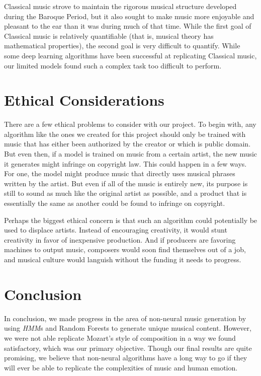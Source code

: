 \documentclass[11pt]{article}
\begin{document}
Classical music strove to maintain the rigorous musical structure 
developed during the Baroque Period, but it also sought to make music more 
enjoyable and pleasant to the ear than it was during much of that time. 
While the first goal of Classical music is relatively quantifiable (that is,
musical theory has mathematical properties), the second goal is very difficult to
quantify. While some deep learning algorithms have been successful at replicating Classical music, our limited models found such a complex task too difficult to perform.

\section{Ethical Considerations}
There are a few ethical problems to consider with our project. To begin with, any algorithm like the ones we created for this project should only be trained with music that has either been authorized by the creator or which is public domain. But even then, if a model is trained on music from a certain artist, the new music it generates might infringe on copyright law. This could happen in a few ways. For one, the model might produce music that directly uses musical phrases written by the artist. But even if all of the music is entirely new, its purpose is still to sound as much like the original artist as possible, and a product that is essentially the same as another could be found to infringe on copyright.

Perhaps the biggest ethical concern is that such an algorithm could potentially be used to displace artists. Instead of encouraging creativity, it would stunt creativity in favor of inexpensive production. And if producers are favoring machines to output music, composers would soon find themselves out of a job, and musical culture would languish without the funding it needs to progress.

\section{Conclusion}
In conclusion, we made progress in the area of non-neural music generation by using \textit{HMM}s and Random Forests to generate unique musical content. However, we were not able replicate Mozart's style of composition in a way we found satisfactory, which was our primary objective. Though our final results are quite promising, we believe that non-neural algorithms have a long way to go if they will ever be able to replicate the complexities of music and human emotion.


\printbibliography
\end{document}
